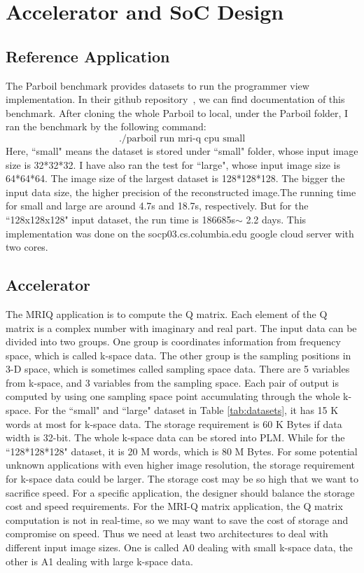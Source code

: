 \section{Accelerator and SoC Design}

\subsection{Reference Application}

The Parboil benchmark provides datasets to run the programmer view
implementation. In their github repository~\cite{esp-release}, we can find
documentation of this benchmark. After cloning the whole Parboil to local, under
the Parboil folder, I ran the benchmark by the following command:
$$\text{./parboil run mri-q cpu small}$$ Here, ``small" means the dataset is
stored under ``small" folder, whose input image size is 32*32*32. I have also
ran the test for ``large", whose input image size is 64*64*64. The image size of
the largest dataset is 128*128*128.  The bigger the input data size, the higher
precision of the reconstructed image.The running time for small and large are
around 4.7s and 18.7s, respectively. But for the ``128x128x128" input dataset,
the run time is 186685s$ \sim$ 2.2 days. This implementation was done on the
socp03.cs.columbia.edu google cloud server with two cores.

\subsection{Accelerator}

The MRIQ application is to compute the Q matrix. Each element of the Q matrix is
a complex number with imaginary and real part. The input data can be divided
into two groups. One group is coordinates information from frequency space,
which is called k-space data. The other group is the sampling positions in 3-D
space, which is sometimes called sampling space data. There are 5 variables from
k-space, and 3 variables from the sampling space. Each pair of output is
computed by using one sampling space point accumulating through the whole
k-space. For the ``small" and ``large" dataset in Table \ref{tab:datasets}, it has 15
K words at most for k-space data. The storage requirement is 60 K Bytes if data
width is 32-bit. The whole k-space data can be stored into PLM. While for the
``128*128*128" dataset, it is 20 M words, which is 80 M Bytes. For some potential
unknown applications with even higher image resolution, the storage requirement
for k-space data could be larger. The storage cost may be so high that we want
to sacrifice speed. For a specific application, the designer should balance the
storage cost and speed requirements. For the MRI-Q matrix application, the Q
matrix computation is not in real-time, so we may want to save the cost of
storage and compromise on speed. Thus we need at least two architectures to deal
with different input image sizes. One is called A0 dealing with small k-space
data, the other is A1 dealing with large k-space data.\\



